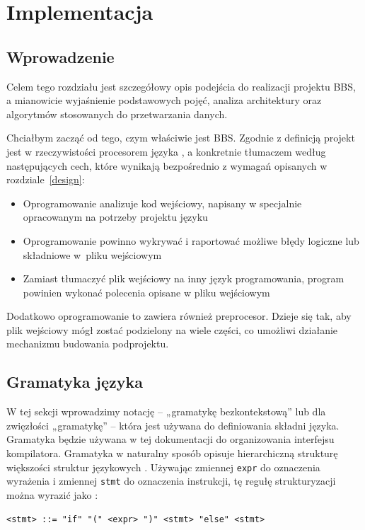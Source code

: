 \chapter{Implementacja}
\section{Wprowadzenie}
Celem tego rozdziału jest szczegółowy opis podejścia do realizacji projektu BBS, a mianowicie wyjaśnienie podstawowych pojęć, analiza architektury oraz algorytmów stosowanych do przetwarzania danych.

Chciałbym zacząć od tego, czym właściwie jest BBS. Zgodnie z definicją projekt jest w rzeczywistości procesorem języka \cite{compilers}, a konkretnie tłumaczem według następujących cech, które wynikają bezpośrednio z wymagań opisanych w rozdziale~\ref{design}:
\begin{itemize}
    \item Oprogramowanie analizuje kod wejściowy, napisany w specjalnie opracowanym na potrzeby projektu języku
    \item Oprogramowanie powinno wykrywać i raportować możliwe błędy logiczne lub składniowe w~pliku wejściowym
    \item Zamiast tłumaczyć plik wejściowy na inny język programowania, program powinien wykonać polecenia opisane w pliku wejściowym
\end{itemize}

Dodatkowo oprogramowanie to zawiera również preprocesor. Dzieje się tak, aby plik wejściowy mógł zostać podzielony na wiele części, co umożliwi działanie mechanizmu budowania podprojektu.

\section{Gramatyka języka}

W tej sekcji wprowadzimy notację -- „gramatykę bezkontekstową” lub dla zwięzłości „gramatykę” -- która jest używana do definiowania składni języka. Gramatyka będzie używana w tej dokumentacji do organizowania interfejsu kompilatora. Gramatyka w naturalny sposób opisuje hierarchiczną strukturę większości struktur językowych \cite{compilers}. Używając zmiennej \texttt{expr} do oznaczenia wyrażenia i zmiennej \texttt{stmt} do oznaczenia instrukcji, tę regułę strukturyzacji można wyrazić jako :

\begin{lstlisting}[label=list:example_grammar,caption=Przykładowy opis gramatyki,basicstyle=\footnotesize\ttfamily]
<stmt> ::= "if" "(" <expr> ")" <stmt> "else" <stmt>
\end{lstlisting}

